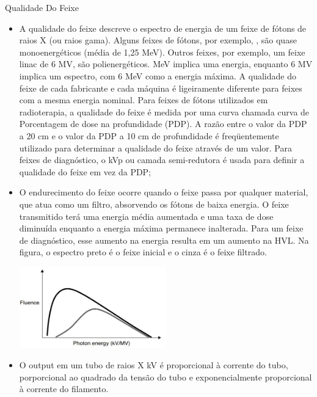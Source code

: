 \documentclass[11pt,a4paper]{article}
\newcounter{exemplo}
\begin{document}
\begin{exemplo}
    \textcolor{CarnationPink}{Qualidade Do Feixe}
    \begin{itemize}
        \item A qualidade do feixe descreve o espectro de energia de um feixe de fótons de raios X (ou raios gama). Alguns feixes de fótons, por exemplo, , são quase monoenergéticos (média de 1,25 MeV). Outros feixes, por exemplo, um feixe linac de 6 MV, são polienergéticos. MeV implica uma energia, enquanto 6 MV implica um espectro, com 6 MeV como a energia máxima. A qualidade do feixe de cada fabricante e cada máquina é ligeiramente diferente para feixes com a mesma energia nominal. Para feixes de fótons utilizados em radioterapia, a qualidade do feixe é medida por uma curva chamada curva de Porcentagem de dose na profundidade (PDP). A razão entre o valor da PDP a 20 cm e o valor da PDP a 10 cm de profundidade é freqüentemente utilizado para determinar a qualidade do feixe através de um valor. Para feixes de diagnóstico, o kVp ou camada semi-redutora é usada para definir a qualidade do feixe em vez da PDP;
        
        \item O endurecimento do feixe ocorre quando o feixe passa por qualquer material, que atua como um filtro, absorvendo os fótons de baixa energia. O feixe transmitido terá uma energia média aumentada e uma taxa de dose diminuída enquanto a energia máxima permanece inalterada. Para um feixe de diagnóstico, esse aumento na energia resulta em um aumento na HVL. Na figura, o espectro preto é o feixe inicial e o cinza é o feixe filtrado.

        \begin{center}
            \includegraphics[width=0.5\textwidth]{Imagens/endurecimentoDoFeixe.JPG}
        \end{center}

        \item O output em um tubo de raios X kV é proporcional à corrente do tubo, porporcional ao quadrado da tensão do tubo e exponencialmente proporcional à corrente do filamento.
        

\end{itemize}
\end{exemplo}
\end{document}

